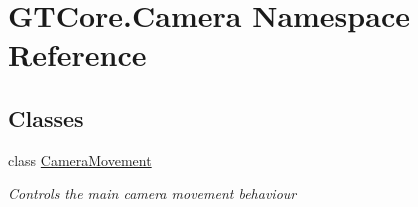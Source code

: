 \hypertarget{namespace_g_t_core_1_1_camera}{}\section{G\+T\+Core.\+Camera Namespace Reference}
\label{namespace_g_t_core_1_1_camera}
\subsection*{Classes}
\begin{DoxyCompactItemize}
\item 
class \hyperlink{class_g_t_core_1_1_camera_1_1_camera_movement}{Camera\+Movement}
\begin{DoxyCompactList}\small\item\em Controls the main camera movement behaviour \end{DoxyCompactList}\end{DoxyCompactItemize}
